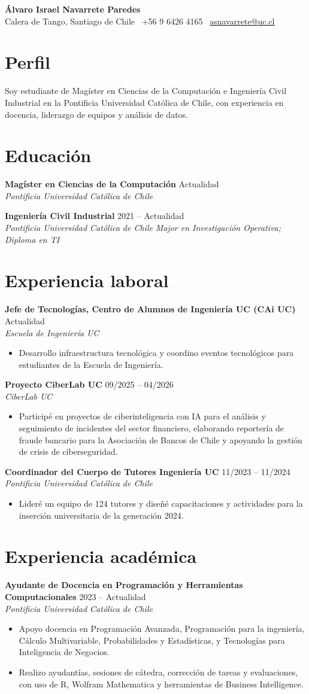 \documentclass[11pt,a4paper]{article}
\makeatletter
\newcommand{\cvheader}{
    {\LARGE \textbf{Álvaro Israel Navarrete Paredes}}\\[0.35em]
    Calera de Tango, Santiago de Chile \textbar\ +56 9 6426 4165 \textbar\ \href{mailto:asnavarrete@uc.cl}{asnavarrete@uc.cl}
}
\newcommand{\cventry}[4]{
    \textbf{#1} \hfill #2\\
    \textit{#3} \hfill \textit{#4}
}
\newcommand{\cvliststart}{\begin{itemize}[leftmargin=1.1em,itemsep=0.05em,topsep=0.05em]}
\newcommand{\cvlistend}{\end{itemize}}
\makeatother
\begin{document}
\begin{center}
\cvheader
\end{center}

\section{Perfil}
Soy estudiante de Magíster en Ciencias de la Computación e Ingeniería Civil Industrial en la Pontificia Universidad Católica de Chile, con experiencia en docencia, liderazgo de equipos y análisis de datos.

\section{Educación}
\cventry{Magíster en Ciencias de la Computación}{Actualidad}{Pontificia Universidad Católica de Chile}{}

\cventry{Ingeniería Civil Industrial}{2021 -- Actualidad}{Pontificia Universidad Católica de Chile}{Major en Investigación Operativa; Diploma en TI}

\section{Experiencia laboral}
\cventry{Jefe de Tecnologías, Centro de Alumnos de Ingeniería UC (CAi UC)}{Actualidad}{Escuela de Ingeniería UC}{}
\cvliststart
    \item Desarrollo infraestructura tecnológica y coordino eventos tecnológicos para estudiantes de la Escuela de Ingeniería.
\cvlistend

\cventry{Proyecto CiberLab UC}{09/2025 -- 04/2026}{CiberLab UC}{}
\cvliststart
    \item Participé en proyectos de ciberinteligencia con IA para el análisis y seguimiento de incidentes del sector financiero, elaborando reportería de fraude bancario para la Asociación de Bancos de Chile y apoyando la gestión de crisis de ciberseguridad.
\cvlistend

\cventry{Coordinador del Cuerpo de Tutores Ingeniería UC}{11/2023 -- 11/2024}{Pontificia Universidad Católica de Chile}{}
\cvliststart
    \item Lideré un equipo de 124 tutores y diseñé capacitaciones y actividades para la inserción universitaria de la generación 2024.
\cvlistend

\section{Experiencia académica}
\cventry{Ayudante de Docencia en Programación y Herramientas Computacionales}{2023 -- Actualidad}{Pontificia Universidad Católica de Chile}{}
\cvliststart
    \item Apoyo docencia en Programación Avanzada, Programación para la ingeniería, Cálculo Multivariable, Probabilidades y Estadísticas, y Tecnologías para Inteligencia de Negocios.
    \item Realizo ayudantías, sesiones de cátedra, corrección de tareas y evaluaciones, con uso de R, Wolfram Mathematica y herramientas de Business Intelligence.
\cvlistend
\end{document}
